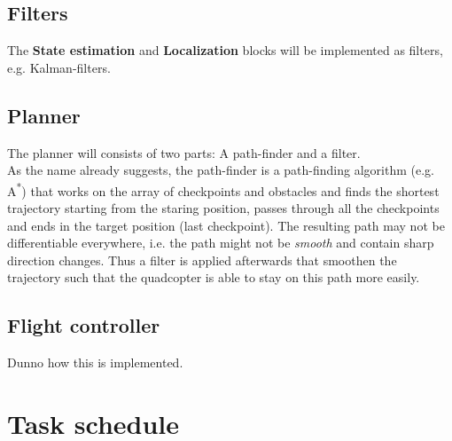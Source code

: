 \documentclass[a4paper,footsepline]{scrartcl}
\begin{document}
\subsection*{Filters}
The \textbf{State estimation} and \textbf{Localization} blocks will be implemented as filters, e.g. Kalman-filters.
\subsection*{Planner}
The planner will consists of two parts: A path-finder and a filter.\\
As the name already suggests, the path-finder is a path-finding algorithm (e.g. A\textsuperscript{*}) that works on the array of checkpoints and obstacles and finds the shortest trajectory starting from the staring position, passes through all the checkpoints and ends in the target position (last checkpoint). The resulting path may not be differentiable everywhere, i.e. the path might not be \emph{smooth} and contain sharp direction changes. Thus a filter is applied afterwards that smoothen the trajectory such that the quadcopter is able to stay on this path more easily.
\subsection*{Flight controller}
Dunno how this is implemented.
\FloatBarrier
\section*{Task schedule}
	
\end{document}
